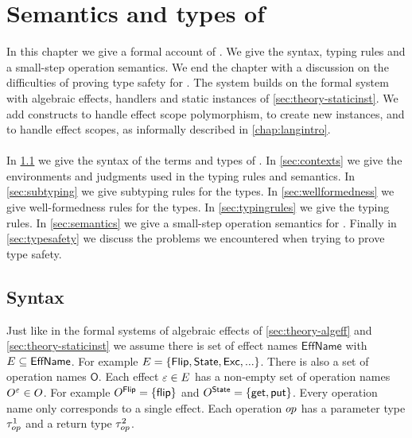 {%

\chapter{\label{chap:langtheory}Semantics and types of \lang{}}

In this chapter we give a formal account of \lang{}.
We give the syntax, typing rules and a small-step operation semantics.
We end the chapter with a discussion on the difficulties of proving type safety for \lang{}.
The system builds on the formal system with algebraic effects, handlers and static instances of \cref{sec:theory-staticinst}.
We add constructs to handle effect scope polymorphism, to create new instances, and to handle effect scopes, as informally described in \cref{chap:langintro}.
\\\\
In \cref{sec:syntax} we give the syntax of the terms and types of \lang{}.
In \cref{sec:contexts} we give the environments and judgments used in the typing rules and semantics.
In \cref{sec:subtyping} we give subtyping rules for the types.
In \cref{sec:wellformedness} we give well-formedness rules for the types.
In \cref{sec:typingrules} we give the typing rules.
In \cref{sec:semantics} we give a small-step operation semantics for \lang{}.
Finally in \cref{sec:typesafety} we discuss the problems we encountered when trying to prove type safety.

\section{Syntax}
\label{sec:syntax}
Just like in the formal systems of algebraic effects of \cref{sec:theory-algeff} and \cref{sec:theory-staticinst}
we assume there is set of effect names $\mathsf{EffName}$ with $E \subseteq \mathsf{EffName}$.
For example $E = \{ \mathsf{Flip}, \mathsf{State}, \mathsf{Exc}, ... \}$.
There is also a set of operation names $\mathsf{O}$.
Each effect $\varepsilon \in E$ has a non-empty set of operation names $O^{\varepsilon} \in O$.
For example $O^{\mathsf{Flip}} = \{\mathsf{flip}\}$ and $O^{\mathsf{State}} = \{\mathsf{get}, \mathsf{put}\}$.
Every operation name only corresponds to a single effect.
Each operation $op$ has a parameter type $\tau^1_{op}$ and a return type $\tau^2_{op}$.
\\\\

}
